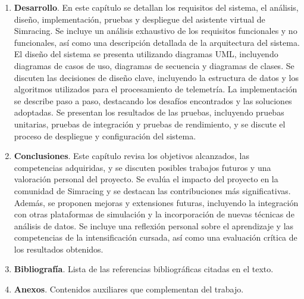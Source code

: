 \begin{enumerate}
\item \textbf{Desarrollo}.
En este capítulo se detallan los requisitos del sistema, el análisis, diseño, implementación, pruebas y despliegue del asistente virtual de Simracing. Se incluye un análisis exhaustivo de los requisitos funcionales y no funcionales, así como una descripción detallada de la arquitectura del sistema. El diseño del sistema se presenta utilizando diagramas UML, incluyendo diagramas de casos de uso, diagramas de secuencia y diagramas de clases. Se discuten las decisiones de diseño clave, incluyendo la estructura de datos y los algoritmos utilizados para el procesamiento de telemetría. La implementación se describe paso a paso, destacando los desafíos encontrados y las soluciones adoptadas. Se presentan los resultados de las pruebas, incluyendo pruebas unitarias, pruebas de integración y pruebas de rendimiento, y se discute el proceso de despliegue y configuración del sistema.

\item \textbf{Conclusiones}.
Este capítulo revisa los objetivos alcanzados, las competencias adquiridas, y se discuten posibles trabajos futuros y una valoración personal del proyecto. Se evalúa el impacto del proyecto en la comunidad de Simracing y se destacan las contribuciones más significativas. Además, se proponen mejoras y extensiones futuras, incluyendo la integración con otras plataformas de simulación y la incorporación de nuevas técnicas de análisis de datos. Se incluye una reflexión personal sobre el aprendizaje y las competencias de la intensificación cursada, así como una evaluación crítica de los resultados obtenidos.

\item \textbf{Bibliografía}. Lista de las referencias bibliográficas citadas en el texto.

\item \textbf{Anexos}. Contenidos auxiliares que complementan del trabajo.
\end{enumerate}










